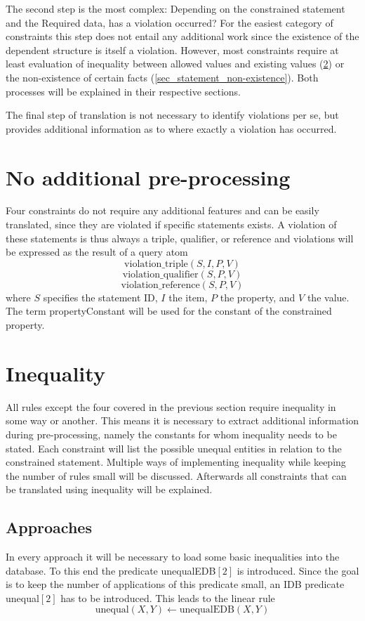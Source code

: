 \documentclass[hyperref,bachelorofscience,fleqn]{cgvpub}
\begin{document}
The second step is the most complex: Depending on the constrained statement and the Required data, has a violation occurred? For the easiest category of constraints this step does not entail any additional work since the existence of the dependent structure is itself a violation. However, most constraints require at least evaluation of inequality between allowed values and existing values (\ref{sec_inequality}) or the non-existence of certain facts (\ref{sec_statement_non-existence}). Both processes will be explained in their respective sections.

The final step of translation is not necessary to identify violations per se, but provides additional information as to where exactly a violation has occurred. 

\section{No additional pre-processing}\label{sec_no_preprocessing}
Four constraints do not require any additional features and can be easily translated, since they are violated if specific statements exists. A violation of these statements is thus always a triple, qualifier, or reference and violations will be expressed as the result of a query atom
\[\text{violation\_triple}(S, I, P, V)\]
\[\text{violation\_qualifier}(S, P, V)\]
\[\text{violation\_reference}(S, P, V)\]
where \(S\) specifies the statement ID, \(I\) the item, \(P\) the property, and \(V\) the value. The term propertyConstant will be used for the constant of the constrained property.

\section{Inequality}\label{sec_inequality}
All rules except the four covered in the previous section require inequality in some way or another. This means it is necessary to extract additional information during pre-processing, namely the constants for whom inequality needs to be stated. Each constraint will list the possible unequal entities in relation to the constrained statement. Multiple ways of implementing inequality while keeping the number of rules small will be discussed. Afterwards all constraints that can be translated using inequality will be explained.

\subsection{Approaches}
In every approach it will be necessary to load some basic inequalities into the database. To this end the predicate unequalEDB\([2]\) is introduced. Since the goal is to keep the number of applications of this predicate small, an IDB predicate unequal\([2]\) has to be introduced. This leads to the linear rule
\begin{equation*}
\text{unequal}(X, Y) \leftarrow \text{unequalEDB}(X, Y)
\end{equation*}
\end{document}
